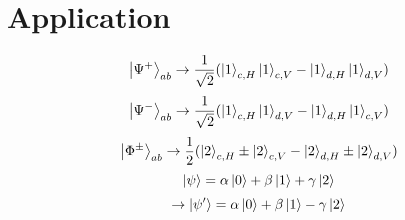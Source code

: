 \documentclass[9pt]{article}
\begin{document}
\section{Application}
\begin{equation*}
    \ket{\Psi^+}_{ab}\rightarrow \frac{1}{\sqrt{2}}(\ket{1}_{c,H}\ket{1}_{c,V}-\ket{1}_{d,H}\ket{1}_{d,V})
\end{equation*}
\begin{equation*}
    \ket{\Psi^-}_{ab}\rightarrow \frac{1}{\sqrt{2}}(\ket{1}_{c,H}\ket{1}_{d,V}-\ket{1}_{d,H}\ket{1}_{c,V})
\end{equation*}
\begin{equation*}
    \ket{\Phi^\pm}_{ab}\rightarrow \frac{1}{2}(\ket{2}_{c,H}\pm\ket{2}_{c,V}-\ket{2}_{d,H}\pm\ket{2}_{d,V})
\end{equation*}
\begin{equation*}
    \ket{\psi}=\alpha\ket{0}+\beta\ket{1}+\gamma\ket{2}
\end{equation*}
\begin{equation*}
    \rightarrow \ket{\psi{'}}=\alpha\ket{0}+\beta\ket{1}-\gamma\ket{2}
\end{equation*}
\end{document}
